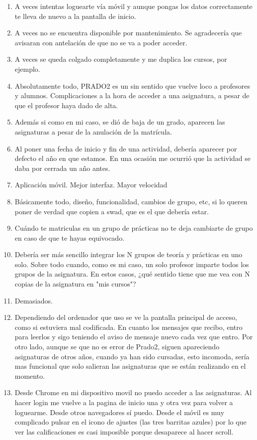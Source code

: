 \begin{enumerate}
\item A veces intentas loguearte vía móvil y aunque pongas los datos correctamente te lleva de nuevo a la pantalla de inicio.
\item A veces no se encuentra disponible por mantenimiento. Se agradecería que avisaran con antelación de que no se va a poder acceder.
\item A veces se queda colgado completamente y me duplica los cursos, por ejemplo.
\item Absolutamente todo, PRADO2 es un sin sentido que vuelve loco a profesores y alumnos. Complicaciones a la hora de acceder a una asignatura, a pesar de que el profesor haya dado de alta.
\item Además si como en mi caso, se dió de baja de un grado, aparecen las asignaturas a pesar de la anulación de la matrícula.
\item Al poner una fecha de inicio y fin de una actividad, debería aparecer por defecto el año en que estamos. En una ocasión me ocurrió que la actividad se daba por cerrada un año antes.
\item Aplicación móvil. Mejor interfaz. Mayor velocidad
\item Básicamente todo, diseño, funcionalidad, cambios de grupo, etc, si lo queren poner de verdad que copien a swad, que es el que debería estar.
\item Cuándo te matriculas en un grupo de prácticas no te deja cambiarte de grupo en caso de que te hayas equivocado.
\item Debería ser más sencillo integrar los N grupos de teoría y prácticas en uno solo. Sobre todo cuando, como es mi caso, un solo profesor imparte todos los grupos de la asignatura. En estos casos, ¿qué sentido tiene que me vea con N copias de la asignatura en "mis cursos"?
\item Demasiados.
\item Dependiendo del ordenador que uso se ve la pantalla principal de acceso, como si estuviera mal codificada. En cuanto los mensajes que recibo, entro para leerlos y sigo teniendo el aviso de mensaje nuevo cada vez que entro. Por otro lado, aunque se que no es error de Prado2, siguen apareciendo asignaturas de otros años, cuando ya han sido cursadas, esto incomoda, sería mas funcional que solo salieran las asignaturas que se están realizando en el momento.
\item Desde Chrome en mi dispositivo movil no puedo acceder a las asignaturas. Al hacer login me vuelve a la pagina de inicio una y otra vez para volver a loguearme. Desde otros navegadores sí puedo. Desde el móvil es muy complicado pulsar en el icono de ajustes (las tres barritas azules) por lo que ver las calificaciones es casi imposible porque desaparece al hacer scroll.

\end{enumerate}
